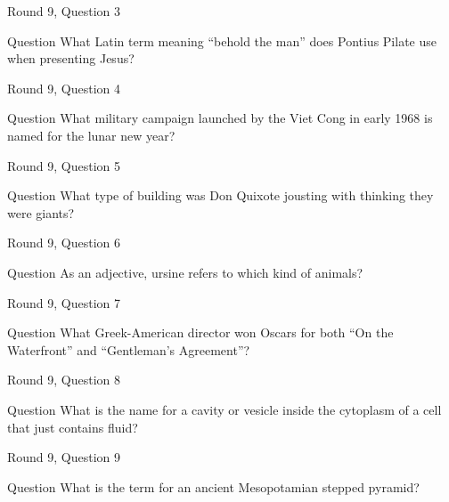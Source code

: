 \documentclass[11pt]{beamer}
\begin{document}
\begin{frame}{Round 9, Question 3}
\begin{block}{Question}
What Latin term meaning ``behold the man'' does Pontius Pilate use when presenting Jesus\@?
\end{block}
\end{frame}
    

\begin{frame}{Round 9, Question 4}
\begin{block}{Question}
What military campaign launched by the Viet Cong in early 1968 is named for the lunar new year\@?
\end{block}
\end{frame}
    

\begin{frame}{Round 9, Question 5}
\begin{block}{Question}
What type of building was Don Quixote jousting with thinking they were giants\@?
\end{block}
\end{frame}
    

\begin{frame}{Round 9, Question 6}
\begin{block}{Question}
As an adjective, ursine refers to which kind of animals\@?
\end{block}
\end{frame}
    

\begin{frame}{Round 9, Question 7}
\begin{block}{Question}
What Greek-American director won Oscars for both ``On the Waterfront'' and ``Gentleman's Agreement''\@?
\end{block}
\end{frame}
    

\begin{frame}{Round 9, Question 8}
\begin{block}{Question}
What is the name for a cavity or vesicle inside the cytoplasm of a cell that just contains fluid\@?
\end{block}
\end{frame}
    

\begin{frame}{Round 9, Question 9}
\begin{block}{Question}
What is the term for an ancient Mesopotamian stepped pyramid\@?
\end{block}
\end{frame}
    
\end{document}

